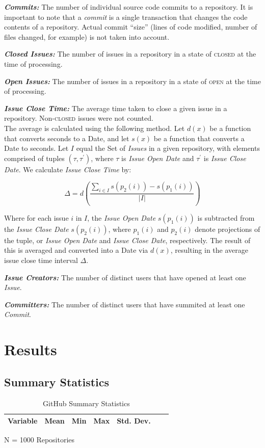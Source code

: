\documentclass{proc}
\begin{document}
{{{{{{{\noindent \textbf{\textit{Commits:}}
The number of individual source code commits to a repository. It is important to note that a \textit{commit} is a single transaction that changes the code contents of a repository. Actual commit ``size'' (lines of code modified, number of files changed, for example) is not taken into account.

\noindent \textbf{\textit{Closed Issues:}}
The number of issues in a repository in a state of \textsc{closed} at the time of processing.

\noindent \textbf{\textit{Open Issues:}}
The number of issues in a repository in a state of \textsc{open} at the time of processing.

\noindent \textbf{\textit{Issue Close Time:}}
The average time taken to close a given issue in a repository. Non-\textsc{closed} issues were not counted.\\

The average is calculated using the following method. Let $d(x)$ be a function that converts seconds to a Date, and let $s(x)$ be a function that converts a Date to seconds. Let $I$ equal the Set of \textit{Issues} in a given repository, with elements comprised of tuples $(\tau, \tau^\prime)$, where $\tau$ is \textit{Issue Open Date} and $\tau^\prime$ is \textit{Issue Close Date}. We calculate \textit{Issue Close Time} by: 

\[ \Delta = d\left( \frac{\sum_{i \in I} s\left(p_{2}(i) \right) - s\left(p_{1}(i) \right)  } {|I|} \right) \]

Where for each issue $i$ in $I$, the \textit{Issue Open Date} $s( p_{1}(i))$ is subtracted from the \textit{Issue Close Date} $s( p_{2}(i))$, where $p_{1}(i)$ and $p_{2}(i)$ denote projections of the tuple, or \textit{Issue Open Date} and \textit{Issue Close Date}, respectively. The result of this is averaged and converted into a Date via $d(x)$, resulting in the average issue close time interval $\Delta$.

\noindent \textbf{\textit{Issue Creators:}}
The number of distinct users that have opened at least one \textit{Issue}.

\noindent \textbf{\textit{Committers:}}
The number of distinct users that have summited at least one \textit{Commit}.

\section{Results}

\subsection{Summary Statistics}
\begin{table}[!ht]
\begin{center}
\begin{tabular}{rrrrrrr}
\hline
Variable & Mean & Min & Max & Std. Dev. \\
\hline

\hline
\end{tabular}
N = 1000 Repositories
\caption{GitHub Summary Statistics}
\label{table:summary_stats}
\end{center}
\end{table}

}}}}}}}
\end{document}
